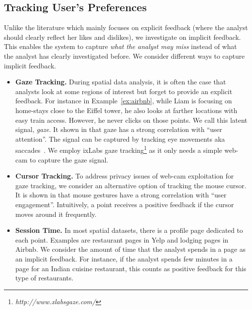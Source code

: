 \documentclass[conference,compsoc]{IEEEtran}
\begin{document}
\subsection{Tracking User's Preferences}

Unlike the literature which mainly focuses on explicit feedback (where the analyst should clearly reflect her likes and dislikes), we investigate on implicit feedback. This enables the system to capture {\em what the analyst may miss} instead of what the analyst has clearly investigated before. We consider different ways to capture implicit feedback.

\begin{itemize}[leftmargin=*]
\item {\bf Gaze Tracking.} During spatial data analysis, it is often the case that analysts look at some regions of interest but forget to provide an explicit feedback. For instance in Example~\ref{ex:airbnb}, while Liam is focusing on home-stays close to the Eiffel tower, he also looks at farther locations with easy train access. However, he never clicks on those points. We call this latent signal, {\em gaze}. It shown in \cite{fischer1999investigation} that gaze has a strong correlation with ``user attention''. The signal can be captured by tracking eye movements aka saccades~\cite{arapakis2014user}. We employ {\sc ixLabs} gaze tracking\footnote{\it http://www.xlabsgaze.com/} as it only needs a simple web-cam to capture the gaze signal.
\item {\bf Cursor Tracking.} To address privacy issues of web-cam exploitation for gaze tracking, we consider an alternative option of tracking the mouse cursor. It is shown in \cite{arapakis2014understanding} that mouse gestures have a strong correlation with ``user engagement''. Intuitively, a point receives a positive feedback if the cursor moves around it frequently.
\item {\bf Session Time.} In most spatial datasets, there is a profile page dedicated to each point. Examples are restaurant pages in Yelp and lodging pages in Airbnb. We consider the amount of time that the analyst spends in a page as an implicit feedback. For instance, if the analyst spends few minutes in a page for an Indian cuisine restaurant, this counts as positive feedback for this type of restaurants. 
\end{itemize}


\end{document}
